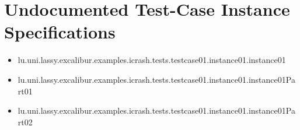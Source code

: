 \section[Undocumented Test-Case Instance Specifications]{Undocumented Test-Case Instance Specifications}
\begin{itemize}
\item lu.uni.lassy.excalibur.examples.icrash.tests.testcase01.instance01.instance01 
\item lu.uni.lassy.excalibur.examples.icrash.tests.testcase01.instance01.instance01Part01 
\item lu.uni.lassy.excalibur.examples.icrash.tests.testcase01.instance01.instance01Part02 
\end{itemize}



